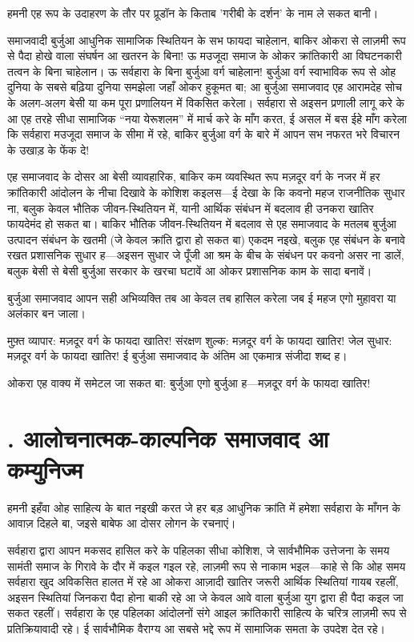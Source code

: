 \documentclass[12pt,a4paper,oneside]{book}
\begin{document}
हमनी एह रूप के उदाहरण के तौर पर प्रूडॉन के किताब 'गरीबी के दर्शन' के नाम ले सकत बानी।

समाजवादी बुर्जुआ आधुनिक सामाजिक स्थितियन के सभ फायदा चाहेलान, बाकिर ओकरा से लाज़मी रूप से पैदा होखे वाला संघर्षन आ खतरन के बिना! ऊ मउजूदा समाज के ओकर क्रांतिकारी आ विघटनकारी तत्वन के बिना चाहेलान। ऊ सर्वहारा के बिना बुर्जुआ वर्ग चाहेलान! बुर्जुआ वर्ग स्वाभाविक रूप से ओह दुनिया के सबसे बढ़िया दुनिया समझेला जहाँ ओकर हुकूमत बा; आ बुर्जुआ समाजवाद एह आरामदेह सोच के अलग-अलग बेसी या कम पूरा प्रणालियन में विकसित करेला। सर्वहारा से अइसन प्रणाली लागू करे के आ एह तरहे सीधा सामाजिक “नया येरूशलम” में मार्च करे के माँग करत, ई असल में बस ईहे माँग करेला कि सर्वहारा मउजूदा समाज के सीमा में रहे, बाकिर बुर्जुआ वर्ग के बारे में आपन सभ नफरत भरे विचारन के उखाड़ के फेंक दे!

एह समाजवाद के दोसर आ बेसी व्यावहारिक, बाकिर कम व्यवस्थित रूप मज़दूर वर्ग के नजर में हर क्रांतिकारी आंदोलन के नीचा दिखावे के कोशिश कइलस—ई देखा के कि कवनो महज राजनीतिक सुधार ना, बलुक केवल भौतिक जीवन-स्थितियन में, यानी आर्थिक संबंधन में बदलाव ही उनकरा खातिर फायदेमंद हो सकत बा। बाकिर भौतिक जीवन-स्थितियन में बदलाव से एह समाजवाद के मतलब बुर्जुआ उत्पादन संबंधन के खतमी (जे केवल क्रांति द्वारा हो सकत बा) एकदम नइखे, बलुक एह संबंधन के बनावे रखत प्रशासनिक सुधार ह—अइसन सुधार जे पूँजी आ श्रम के बीच के संबंधन पर कवनो असर ना डालें, बलुक बेसी से बेसी बुर्जुआ सरकार के खरचा घटावें आ ओकर प्रशासनिक काम के सादा बनावें।

बुर्जुआ समाजवाद आपन सही अभिव्यक्ति तब आ केवल तब हासिल करेला जब ई महज एगो मुहावरा या अलंकार बन जाला।

मुफ़्त व्यापार: मज़दूर वर्ग के फायदा खातिर! संरक्षण शुल्क: मज़दूर वर्ग के फायदा खातिर! जेल सुधार: मज़दूर वर्ग के फायदा खातिर! ई बुर्जुआ समाजवाद के अंतिम आ एकमात्र संजीदा शब्द ह।

ओकरा एह वाक्य में समेटल जा सकत बा: बुर्जुआ एगो बुर्जुआ ह—मज़दूर वर्ग के फायदा खातिर!


\section*{{}. आलोचनात्मक-काल्पनिक समाजवाद आ कम्युनिज्म}
हमनी इहँवा ओह साहित्य के बात नइखी करत जे हर बड़ आधुनिक क्रांति में हमेशा सर्वहारा के माँगन के आवाज़ दिहले बा, जइसे बाबेफ आ दोसर लोगन के रचनाएं।

सर्वहारा द्वारा आपन मकसद हासिल करे के पहिलका सीधा कोशिश, जे सार्वभौमिक उत्तेजना के समय सामंती समाज के गिरावे के दौर में कइल गइल रहे, लाज़मी रूप से नाकाम भइल—काहे से कि ओह समय सर्वहारा खुद अविकसित हालत में रहे आ ओकरा आज़ादी खातिर जरूरी आर्थिक स्थितियां गायब रहलीं, अइसन स्थितियां जिनकरा पैदा होना बाकी रहे आ जे केवल आवे वाला बुर्जुआ युग द्वारा ही पैदा कइल जा सकत रहलीं। सर्वहारा के एह पहिलका आंदोलनों संगे आइल क्रांतिकारी साहित्य के चरित्र लाज़मी रूप से प्रतिक्रियावादी रहे। ई सार्वभौमिक वैराग्य आ सबसे भद्दे रूप में सामाजिक समता के उपदेश देत रहे।
\end{document}

